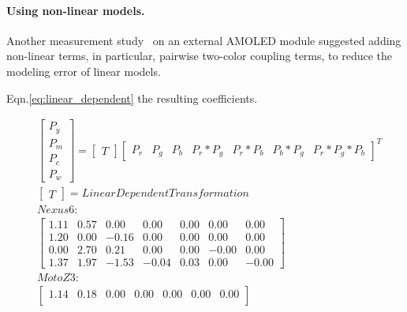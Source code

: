 \paragraph{Using non-linear models.}
\label{subsec:nonlinear}
Another measurement study~\cite{park2015accurate} on an external
AMOLED module
suggested %
adding non-linear terms, in particular, pairwise two-color
coupling terms, to reduce the modeling error of linear models.


Eqn.\ref{eq:linear_dependent} the resulting coefficients.

\begin{subequations}
\begin{align}
	&\begin{bmatrix}
	    P_{y} \\
	    P_{m} \\
	    P_{c} \\
	    P_{w}
	\end{bmatrix}
	=
	\begin{bmatrix}
		T
	\end{bmatrix}
	\begin{bmatrix}
	    P_{r} 	       &
	    P_{g} 	       &
	    P_{b} 	       &
	    P_{r}*P_{g}        &
	    P_{r}*P_{b}        &
	    P_{b}*P_{g}        &
	    P_{r}*P_{g}*P_{b}
	\end{bmatrix}^T
	\\
	&\begin{bmatrix}
		T
	\end{bmatrix}
	=
		Linear Dependent Transformation \nonumber
	\\
	&Nexus 6: \nonumber
	\\
	&\begin{bmatrix}
	      1.11 &       0.57 &       0.00 &       0.00 &       0.00 &       0.00 &       0.00 \\
	      1.20 &       0.00 &      -0.16 &       0.00 &       0.00 &       0.00 &       0.00 \\
	      0.00 &       2.70 &       0.21 &       0.00 &       0.00 &      -0.00 &       0.00 \\
	      1.37 &       1.97 &      -1.53 &      -0.04 &       0.03 &       0.00 &      -0.00
	\end{bmatrix}
	\\
	&Moto Z3: \nonumber
	\\
	&\begin{bmatrix}
	      1.14 &       0.18 &       0.00 &       0.00 &       0.00 &       0.00 &       0.00 \\

\end{bmatrix}
\end{align}
\end{subequations}
